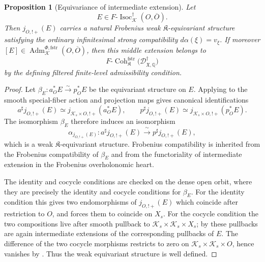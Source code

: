 \documentclass[11pt]{amsart}
\theoremstyle{plain}
\newtheorem{proposition}{Proposition}[section]
\theoremstyle{definition}
\theoremstyle{remark}
\newcommand{\Coh}{\operatorname{Coh}}
\newcommand{\Isoc}{\operatorname{Isoc}}
\newcommand{\fstr}{\mathrm{fstr}}
\newcommand{\Adm}{\operatorname{Adm}}
\begin{document}
\begin{proposition}[Equivariance of intermediate extension]
\label{prop:eq-intermediate-extension}
Let
\[
  E\in F\text{-}\Isoc^{\dagger}_{\mathcal K}(O,\overline O).
\]
Then \(j_{O,!+}(E)\) carries a natural Frobenius weak \(\mathfrak K\)-equivariant
structure satisfying the ordinary infinitesimal strong compatibility
\(d\alpha(\xi)=v_\xi\). If moreover
\([E]\in\Adm^{\Phi,\fstr}_{\mathcal K}(O,\overline O)\), then this middle
extension belongs to
\[
  F\text{-}\Coh^{\fstr}_{\mathfrak K}
  \bigl(\mathscr D^\dagger_{\mathfrak X,\mathbb Q}\bigr)
\]
by the defining filtered finite-level admissibility condition.
\end{proposition}

\begin{proof}
Let \(\beta_E:a_O^*E\xrightarrow{\sim}p_O^*E\) be the equivariant structure on
\(E\). Applying  to the smooth
special-fiber action and projection maps gives canonical identifications
\[
  a^\sharp j_{O,!+}(E)
  \simeq
  j_{\mathcal K_s\times O,!+}(a_O^*E),
  \qquad
  p^\sharp j_{O,!+}(E)
  \simeq
  j_{\mathcal K_s\times O,!+}(p_O^*E).
\]
The isomorphism \(\beta_E\) therefore induces an isomorphism
\[
  \alpha_{j_{O,!+}(E)}:
  a^\sharp j_{O,!+}(E)
  \xrightarrow{\;\sim\;}
  p^\sharp j_{O,!+}(E),
\]
which is a weak \(\mathfrak K\)-equivariant structure. Frobenius compatibility
is inherited from the Frobenius compatibility of \(\beta_E\) and from the
functoriality of intermediate extension in the Frobenius overholonomic heart.

The identity and cocycle conditions are checked on the dense open orbit, where
they are precisely the identity and cocycle conditions for \(\beta_E\). For the
identity condition this gives two endomorphisms of \(j_{O,!+}(E)\) which
coincide after restriction to \(O\), and
 forces them to coincide
on \(X_s\). For the cocycle condition the two compositions live after smooth
pullback to \(\mathcal K_s\times\mathcal K_s\times X_s\); by
 these pullbacks are again
intermediate extensions of the corresponding pullbacks of \(E\). The difference
of the two cocycle morphisms restricts to zero on
\(\mathcal K_s\times\mathcal K_s\times O\), hence vanishes by
. Thus the weak equivariant
structure is well defined.


\end{proof}
\end{document}
